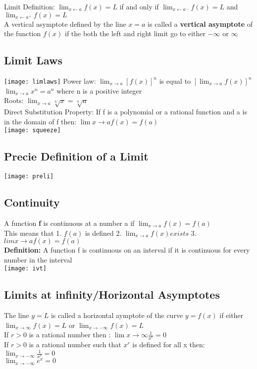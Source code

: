 \documentclass[10pt,a4paper]{article}
\begin{document}
Limit Definition: $\lim_{x\leftarrow a}{f(x)} = L$ if and only if $\lim_{x\leftarrow a^{-}}{f(x)} = L$ and $\lim_{x\leftarrow a^{+}}{f(x)} = L$
\\A vertical asymptote defined by the line $x=a$ is called a \textbf{vertical asymptote} of the function $f(x)$ if the both the left and right limit go to either $-\infty$ or $\infty$
\subsection{Limit Laws}
\texttt{[image: limlaws]}
Power law: $\lim_{x \rightarrow a}{[f(x)]^{n}}$ is equal to $[\lim_{x\rightarrow a}{f(x)}]^{n}$
\\$\lim_{x\rightarrow a}{x^{n}} = a^{n}$ where n is a  positive integer
\\Roots: $\lim_{x\rightarrow a}{\sqrt[n]{x}} = \sqrt[n]{a}$
\\Direct Substitution Property: If f is a polynomial or a rational function and a is in the domain of f then: $\lim{x\rightarrow a}{f(x)} = f(a)$
\\\texttt{[image: squeeze]}
\subsection{Precie Definition of a Limit}
\texttt{[image: preli]}
\subsection{Continuity}
A function \textbf{f} is continuous at a number a if $\lim_{x \rightarrow a}{f(x)} = f(a)$
\\This means that 1. $f(a)$ is defined 2. $\lim_{x\rightarrow a}{f(x)} exists$  3. $lim{x \rightarrow a}{f(x)} = f(a)$
\\ \textbf{Definition:} A function f is continuous on an interval if it is continuous for every number in the interval
\\\texttt{[image: ivt]}
\subsection{Limits at infinity/Horizontal Asymptotes}
The line $y = L$ is called a horizontal aymptote of the curve $y=f(x)$ if either $\lim_{x\rightarrow \infty}{f(x)} = L$ or $\lim_{x\rightarrow -\infty}{f(x)} = L$
\\If $r > 0$ is a rational number then : $\lim{x\rightarrow \infty}{\frac{1}{x^{r}}}=0$
\\ If $r>0$ is a rational number such that $x^{r}$ is defined for all x then: $\lim_{x\rightarrow -\infty}{\frac{1}{x^{r}}} = 0$
\\ $\lim_{x \rightarrow -\infty}{e^{x}} = 0 $
\end{document}
